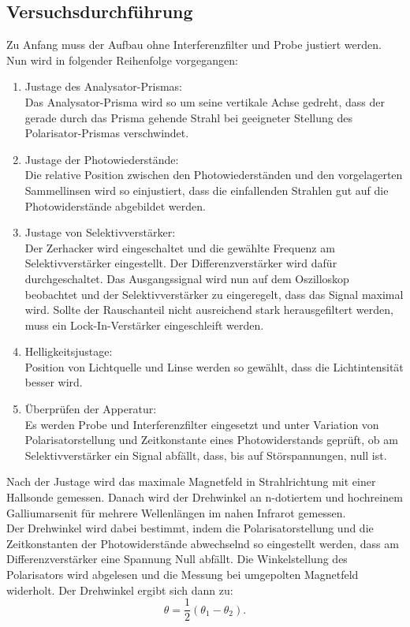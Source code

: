 \subsection{Versuchsdurchführung}
Zu Anfang muss der Aufbau ohne Interferenzfilter und Probe justiert werden.
Nun wird in folgender Reihenfolge vorgegangen:
\begin{enumerate}
  \item Justage des Analysator-Prismas:\\
  Das Analysator-Prisma wird so um seine vertikale Achse gedreht, dass
  der gerade durch das Prisma gehende Strahl bei geeigneter Stellung des
  Polarisator-Prismas verschwindet.
  \item Justage der Photowiederstände:\\
  Die relative Position zwischen den Photowiederständen und den vorgelagerten
  Sammellinsen wird so einjustiert, dass die einfallenden Strahlen gut auf
  die Photowiderstände abgebildet werden.
  \item Justage von Selektivverstärker:\\
  Der Zerhacker wird eingeschaltet und die gewählte Frequenz am Selektivverstärker
  eingestellt. Der Differenzverstärker wird dafür durchgeschaltet. Das Ausgangssignal wird
  nun auf dem Oszilloskop beobachtet und  der Selektivverstärker zu eingeregelt,
  dass das Signal maximal wird. Sollte der Rauschanteil nicht ausreichend stark
  herausgefiltert werden, muss ein Lock-In-Verstärker eingeschleift werden.
  \item Helligkeitsjustage:\\
  Position von Lichtquelle und Linse werden so gewählt, dass die Lichtintensität
  besser wird.
  \item Überprüfen der Apperatur:\\
  Es werden Probe und Interferenzfilter eingesetzt und unter Variation von
  Polarisatorstellung und Zeitkonstante eines Photowiderstands geprüft,
  ob am Selektivverstärker ein Signal abfällt, dass, bis auf Störspannungen, null ist.
\end{enumerate}
Nach der Justage wird das maximale Magnetfeld in Strahlrichtung mit einer Hallsonde gemessen. Danach wird
der Drehwinkel an n-dotiertem und hochreinem Galliumarsenit für mehrere Wellenlängen
im nahen Infrarot gemessen.\\
Der Drehwinkel wird dabei bestimmt, indem die Polarisatorstellung und die Zeitkonstanten der
Photowiderstände abwechselnd so eingestellt werden, dass am Differenzverstärker eine Spannung
Null abfällt. Die Winkelstellung des Polarisators wird abgelesen und die Messung
bei umgepolten Magnetfeld widerholt. Der Drehwinkel ergibt sich dann zu:
\begin{equation}
  \theta = \frac{1}{2} \left(\theta_1 - \theta_2 \right).
  \label{runederaffe}
\end{equation}
